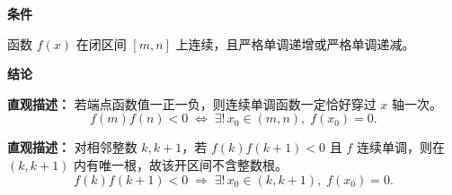 \begin{statementbox}
	\textbf{\textcolor{CStatement}{条件}}
	\begin{description}[style=nextline, leftmargin=2.8em, labelsep=0.5em, itemsep=0.35em]
		\item[\textbf{\textcolor{CStatement}{条件 1（连续且严格单调）：}}]
			函数 $f(x)$ 在闭区间 $[m,n]$ 上连续，且严格单调递增或严格单调递减。
	\end{description}
	\par\textbf{\textcolor{CStatement}{结论}}
	\begin{description}[style=nextline, leftmargin=2.8em, labelsep=0.5em, itemsep=0.45em]
		\item[\textbf{\textcolor{CStatement}{结论一（唯一根充要条件）：}}]
			\textbf{\textcolor{CStatement}{直观描述：}}
			若端点函数值一正一负，则连续单调函数一定恰好穿过 $x$ 轴一次。
			\[
				f(m)f(n)<0\;\Longleftrightarrow\;\exists!\,x_0\in(m,n),\;f(x_0)=0.
			\]
		\item[\textbf{\textcolor{CStatement}{推广结论（整数区间推论）：}}]
			\textbf{\textcolor{CStatement}{直观描述：}}
			对相邻整数 $k,k+1$，若 $f(k)f(k+1)<0$ 且 $f$ 连续单调，则在 $(k,k+1)$ 内有唯一根，故该开区间不含整数根。
			\[
				f(k)f(k+1)<0\;\Longrightarrow\;\exists!\,x_0\in(k,k+1),\;f(x_0)=0.
			\]
	\end{description}

\end{statementbox}
